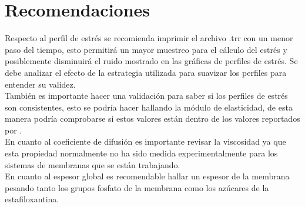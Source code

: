 \section{Recomendaciones}
Respecto al perfil de estr\'{e}s se recomienda imprimir el archivo .trr con un menor paso del tiempo, esto permitir\'{a} un mayor muestreo para el c\'{a}lculo del estr\'{e}s y posiblemente disminuir\'{a} el ruido mostrado en las gr\'{a}ficas de perfiles de estr\'{e}s. Se debe analizar el efecto de la estrategia utilizada para suavizar los perfiles para entender su validez.\\

Tambi\'{e}n es importante hacer una validaci\'{o}n para saber si los perfiles de estr\'{e}s son consistentes, esto se podr\'{i}a hacer hallando la m\'{o}dulo de elasticidad, de esta manera podr\'{i}a comprobarse si estos valores est\'{a}n dentro de los valores reportados por \cite{Perez-Lopez2019VariationsProperties}.\\

En cuanto al coeficiente de difusi\'{o}n es importante revisar la viscosidad ya que esta propiedad normalmente no ha sido medida experimentalmente para los sistemas de membranas que se est\'{a}n trabajando.\\

En cuanto al espesor global es recomendable hallar un espesor de la membrana pesando tanto los grupos fosfato de la membrana como los az\'{u}cares de la estafiloxantina.\\

